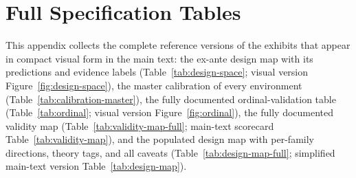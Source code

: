 \section{Full Specification Tables}\label{app:tables}

This appendix collects the complete reference versions of the exhibits that appear in compact visual form in the main text: the ex-ante design map with its predictions and evidence labels (Table~\ref{tab:design-space}; visual version Figure~\ref{fig:design-space}), the master calibration of every environment (Table~\ref{tab:calibration-master}), the fully documented ordinal-validation table (Table~\ref{tab:ordinal}; visual version Figure~\ref{fig:ordinal}), the fully documented validity map (Table~\ref{tab:validity-map-full}; main-text scorecard Table~\ref{tab:validity-map}), and the populated design map with per-family directions, theory tags, and all caveats (Table~\ref{tab:design-map-full}; simplified main-text version Table~\ref{tab:design-map}).

